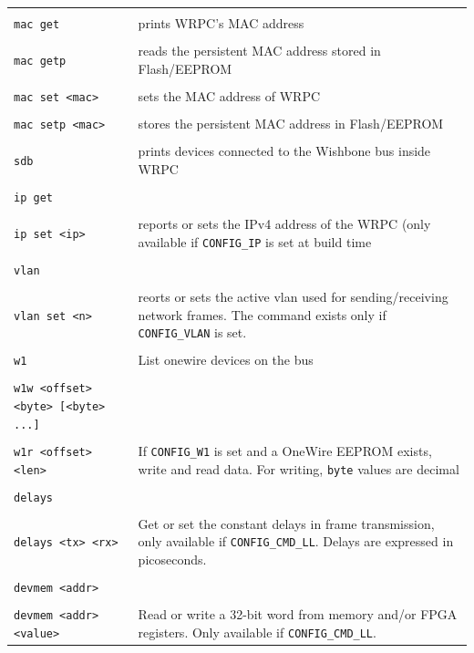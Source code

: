 \documentclass[a4paper, 12pt]{article}
\newcommand{\code}[1]{\texttt{#1}}
\newcommand{\codeHook}[1]{\mbox{\ttfamily\MakeTextUppercase{#1}}}
\begin{document}
\begin{longtable}{  p{8cm}  p{6cm} }
 & \\
  \code{mac get} & prints \codeHook{wrpc}'s \codeHook{mac} address\\
 & \\
  \code{mac getp} & reads the persistent \codeHook{mac} address stored in Flash/EEPROM\\
 & \\
  \code{mac set <mac>} & sets the \codeHook{mac} address of \codeHook{wrpc}\\
 & \\
  \code{mac setp <mac>} & stores the persistent \codeHook{mac} address in Flash/EEPROM\\
 & \\
  \code{sdb} & prints devices connected to the Wishbone bus inside \codeHook{wrpc}\\
 & \\
  \code{ip get} & \\
 & \\
  \code{ip set <ip>} & reports or sets the IPv4 address of the \codeHook{wrpc} (only available if \texttt{CONFIG\_IP} is set at build time\\
 & \\
  \code{vlan} & \\
 & \\
  \code{vlan set <n>} & reorts or sets the active vlan used for sending/receiving network frames. The command exists only if \texttt{CONFIG\_VLAN} is set.\\
 & \\
  \code{w1} & List onewire devices on the bus\\
 & \\
  \code{w1w <offset> <byte> [<byte> ...]}& \\
 & \\
  \code{w1r <offset> <len>} & If \texttt{CONFIG\_W1} is set and a OneWire \codeHook{eeprom} exists, write and read data. For writing, \texttt{byte} values are decimal\\
 & \\
  \code{delays}&\\
 & \\
  \code{delays <tx> <rx>} & Get or set the constant delays in frame transmission, only available if \texttt{CONFIG\_CMD\_LL}. Delays are expressed in picoseconds.\\
 & \\
  \code{devmem <addr>} & \\
 & \\
  \code{devmem <addr> <value>} & Read or write a 32-bit word from memory and/or FPGA registers. Only available if \texttt{CONFIG\_CMD\_LL}.\\

\end{longtable}
\end{document}
